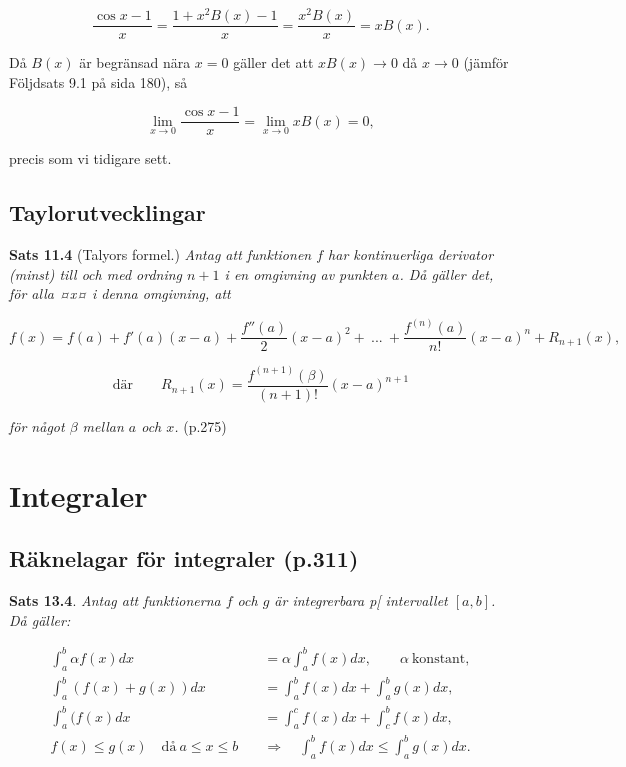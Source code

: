 \documentclass[11pt]{article}
\begin{document}
\[
    \frac{\cos x - 1}{x} = \frac{1 + x^2B(x) - 1}{x} = \frac{x^2B(x)}{x} = xB(x).
\]

Då $B(x)$ är begränsad nära $x = 0$ gäller det att $xB(x) \to 0$ då $x \to 0$ (jämför Följdsats 9.1 på sida 180), så

\[
    \lim_{x \to 0} \frac{\cos x - 1}{x} = \lim_{x \to 0} xB(x) = 0,
\]

precis som vi tidigare sett.

\subsection{Taylorutvecklingar}

\textbf{Sats 11.4} (Talyors formel.) \textit{Antag att funktionen $f$ har kontinuerliga derivator (minst) till och med ordning $n + 1$ i en omgivning av punkten $a$. Då gäller det, för alla ¤x¤ i denna omgivning, att}

\begin{equation}
    f(x) = f(a) + f'(a)(x - a) + \frac{f''(a)}{2}(x - a)^2 +\ ...\ + \frac{f^{(n)}(a)}{n!}(x - a)^n + R_{n + 1}(x),
\end{equation}

\begin{equation}
    \text{där}\qquad R_{n + 1}(x) = \frac{f^{(n + 1)}(\beta)}{(n + 1)!}(x - a)^{n + 1}
\end{equation}

\textit{för något $\beta$ mellan $a$ och $x$.} (p.275)

\newpage
\section{Integraler}

\subsection{Räknelagar för integraler (p.311)}

\textbf{Sats 13.4}. \textit{Antag att funktionerna $f$ och $g$ är integrerbara p[ intervallet $[a, b]$. Då gäller:}

\begin{align}
    \int_a^b{\alpha f(x)} dx &= \alpha \int_a^b{f(x)} dx, \qquad \alpha\ \text{konstant},\\
    \int_a^b{(f(x) + g(x))} dx &= \int_a^b{f(x)} dx + \int_a^b{g(x)} dx,\\
    \int_a^b{(f(x)} dx &= \int_a^c{f(x)} dx + \int_c^b{f(x)} dx,\\
    f(x) \leq g(x) \quad \text{då}\ a \leq x \leq b \quad &\Rightarrow \quad \int_a^b{f(x)} dx \leq \int_a^b{g(x)} dx.
\end{align}
\end{document}

